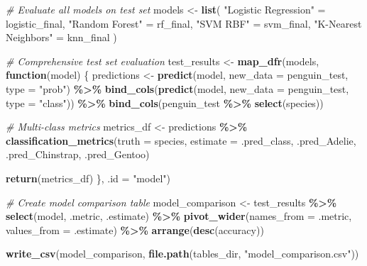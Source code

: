 \documentclass[
]{article}
\newenvironment{Shaded}{\begin{snugshade}}{\end{snugshade}}
\newcommand{\AttributeTok}[1]{\textcolor[rgb]{0.13,0.29,0.53}{#1}}
\newcommand{\CommentTok}[1]{\textcolor[rgb]{0.56,0.35,0.01}{\textit{#1}}}
\newcommand{\ControlFlowTok}[1]{\textcolor[rgb]{0.13,0.29,0.53}{\textbf{#1}}}
\newcommand{\FunctionTok}[1]{\textcolor[rgb]{0.13,0.29,0.53}{\textbf{#1}}}
\newcommand{\NormalTok}[1]{#1}
\newcommand{\OtherTok}[1]{\textcolor[rgb]{0.56,0.35,0.01}{#1}}
\newcommand{\SpecialCharTok}[1]{\textcolor[rgb]{0.81,0.36,0.00}{\textbf{#1}}}
\newcommand{\StringTok}[1]{\textcolor[rgb]{0.31,0.60,0.02}{#1}}
\begin{document}
\begin{Shaded}
\begin{Highlighting}[]
\CommentTok{\# Evaluate all models on test set}
\NormalTok{models }\OtherTok{\textless{}{-}} \FunctionTok{list}\NormalTok{(}
  \StringTok{"Logistic Regression"} \OtherTok{=}\NormalTok{ logistic\_final,}
  \StringTok{"Random Forest"} \OtherTok{=}\NormalTok{ rf\_final,}
  \StringTok{"SVM RBF"} \OtherTok{=}\NormalTok{ svm\_final,}
  \StringTok{"K{-}Nearest Neighbors"} \OtherTok{=}\NormalTok{ knn\_final}
\NormalTok{)}

\CommentTok{\# Comprehensive test set evaluation}
\NormalTok{test\_results }\OtherTok{\textless{}{-}} \FunctionTok{map\_dfr}\NormalTok{(models, }\ControlFlowTok{function}\NormalTok{(model) \{}
\NormalTok{  predictions }\OtherTok{\textless{}{-}} \FunctionTok{predict}\NormalTok{(model, }\AttributeTok{new\_data =}\NormalTok{ penguin\_test, }\AttributeTok{type =} \StringTok{"prob"}\NormalTok{) }\SpecialCharTok{\%\textgreater{}\%}
    \FunctionTok{bind\_cols}\NormalTok{(}\FunctionTok{predict}\NormalTok{(model, }\AttributeTok{new\_data =}\NormalTok{ penguin\_test, }\AttributeTok{type =} \StringTok{"class"}\NormalTok{)) }\SpecialCharTok{\%\textgreater{}\%}
    \FunctionTok{bind\_cols}\NormalTok{(penguin\_test }\SpecialCharTok{\%\textgreater{}\%} \FunctionTok{select}\NormalTok{(species))}

  \CommentTok{\# Multi{-}class metrics}
\NormalTok{  metrics\_df }\OtherTok{\textless{}{-}}\NormalTok{ predictions }\SpecialCharTok{\%\textgreater{}\%}
    \FunctionTok{classification\_metrics}\NormalTok{(}\AttributeTok{truth =}\NormalTok{ species, }\AttributeTok{estimate =}\NormalTok{ .pred\_class,}
\NormalTok{                         .pred\_Adelie, .pred\_Chinstrap, .pred\_Gentoo)}

  \FunctionTok{return}\NormalTok{(metrics\_df)}
\NormalTok{\}, }\AttributeTok{.id =} \StringTok{"model"}\NormalTok{)}

\CommentTok{\# Create model comparison table}
\NormalTok{model\_comparison }\OtherTok{\textless{}{-}}\NormalTok{ test\_results }\SpecialCharTok{\%\textgreater{}\%}
  \FunctionTok{select}\NormalTok{(model, .metric, .estimate) }\SpecialCharTok{\%\textgreater{}\%}
  \FunctionTok{pivot\_wider}\NormalTok{(}\AttributeTok{names\_from =}\NormalTok{ .metric, }\AttributeTok{values\_from =}\NormalTok{ .estimate) }\SpecialCharTok{\%\textgreater{}\%}
  \FunctionTok{arrange}\NormalTok{(}\FunctionTok{desc}\NormalTok{(accuracy))}

\FunctionTok{write\_csv}\NormalTok{(model\_comparison, }\FunctionTok{file.path}\NormalTok{(tables\_dir, }\StringTok{"model\_comparison.csv"}\NormalTok{))}


\end{Highlighting}
\end{Shaded}
\end{document}
